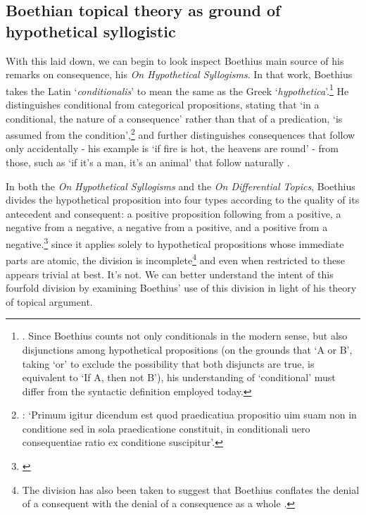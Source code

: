 \documentclass[a4paper, 11pt]{article}
\begin{document}
\subsection{Boethian topical theory as ground of hypothetical syllogistic}
With this laid down, we can begin to look inspect Boethius main source of his remarks on consequence, his \emph{On Hypothetical Syllogisms}. In that work, Boethius takes the Latin `\emph{conditionalis}' to mean the same as the Greek `\emph{hypothetica}'.\footnote{\autocite[1.3.2]{BHS}. Since Boethius counts not only conditionals in the modern sense, 
	but also disjunctions among hypothetical propositions 
	(on the grounds that `A or B', taking `or' to exclude the possibility that both disjuncts are true, 
	is equivalent to `If A, then not B'), 
	his understanding of `conditional' must differ from the syntactic definition employed today.} 
He distinguishes conditional from categorical propositions, stating that `in a conditional, 
the nature of a consequence' rather than that of a predication, `is assumed from the condition',\footnote{\autocite[1.1.6]{BHS}: `Primum igitur dicendum est quod praedicatiua propositio uim suam non in conditione sed in sola praedicatione constituit, in conditionali uero consequentiae ratio ex conditione suscipitur'.} 
and further distinguishes consequences that follow only accidentally 
- his example is `if fire is hot, the heavens are round' - 
from those, such as `if it's a man, it's an animal' that follow naturally \autocite[1.3.6-1.3.7]{BHS}. 

In both the \emph{On Hypothetical Syllogisms} and the \emph{On Differential Topics}, 
Boethius divides the hypothetical proposition into four types according to the quality of its antecedent and consequent: 
a positive proposition following from a positive, 
a negative from a negative, 
a negative from a positive, 
and a positive from a negative.\footnote{\autocite[1.3.5]{BHS} \autocite[1176B-C]{BDT}} since it applies solely to hypothetical propositions whose immediate parts are atomic, the division is incomplete\footnote{The division has also been taken to suggest that Boethius conflates the denial of a consequent with the denial of a consequence as a whole \autocite[157-158]{Martin2007}.} and even when restricted to these appears trivial at best. It's not. We can better understand the intent of this fourfold division by examining Boethius' use of this division in light of his theory of topical argument.
\end{document}
